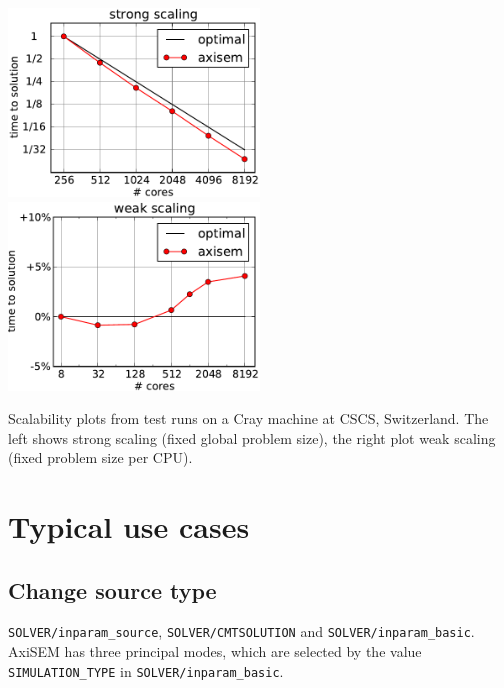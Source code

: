 \documentclass{article}
\begin{document}
\begin{center}
    \includegraphics[height=50mm]{COMPUTATIONAL_COST/strong_scaling_new.pdf}
    \hspace{5mm}
    \includegraphics[height=50mm]{COMPUTATIONAL_COST/weak_scaling_new.pdf}
\end{center}

Scalability plots from test runs on a Cray machine at CSCS, Switzerland. The left shows
strong scaling (fixed global problem size), the right plot weak scaling (fixed problem
size per CPU).


\section{Typical use cases}

\subsection{Change source type}

\verb|SOLVER/inparam_source|, \verb|SOLVER/CMTSOLUTION| and \verb|SOLVER/inparam_basic|.
AxiSEM has three principal modes, which are selected by the value \verb|SIMULATION_TYPE| in
\verb|SOLVER/inparam_basic|.
\end{document}
